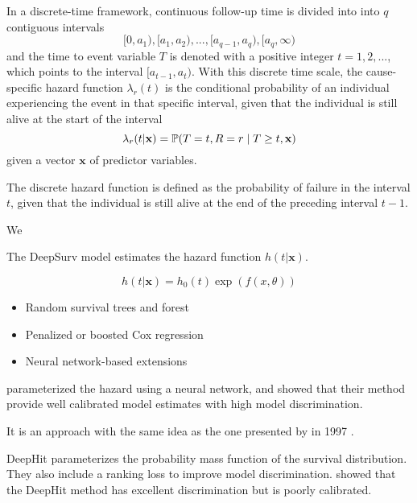 In a discrete-time framework, 
continuous follow-up time is divided into into \(q\) contiguous intervals
%
\begin{equation*}
	[0, a_1), [a_1, a_2), ..., [a_{q-1}, a_q), [a_{q}, \infty)
\end{equation*}
%
and the time to event variable \(T\) is denoted 
with a positive integer \(t = 1, 2, ...\),
which points to the interval \([a_{t-1}, a_{t})\).
With this discrete time scale,
the cause-specific hazard function \(\lambda_{r}(t)\) is 
the conditional probability of an individual experiencing 
the event in that specific interval,
given that the individual is still alive at the start of the interval
%
\begin{equation}
    \lambda_{r}(t | \mathbf{x}) = \operatorname{\mathbb{P}} (T = t, R = r \mid T \geq t, \mathbf{x})
\end{equation}
%
given a vector \(\mathbf{x}\) of predictor variables. 

The discrete hazard function is defined as
the probability of failure in the interval \(t\),
given that the individual is still alive at the end of the preceding interval
\(t - 1\).



\vspace{10em}

We 

The DeepSurv model estimates the hazard function \(h(t|\mathbf{x})\).

\begin{equation}
    h(t | \mathbf{x}) = h_0(t) \exp(f(x, \theta))
\end{equation}

\begin{itemize}
    \item Random survival trees and forest
    \item Penalized or boosted Cox regression
    \item Neural network-based extensions
\end{itemize}




\citeauthor{gensheimerScalable2019} 
parameterized the hazard using a neural network,
and showed that their method provide well calibrated
model estimates with high model discrimination.

It is an approach with the same idea as the one presented by 
\citeauthor{brownUse1997} in 1997 \autocite{brownUse1997}.


DeepHit parameterizes the probability mass function 
of the survival distribution.
They also include a ranking loss to improve model discrimination.
\citeauthor{kvammeContinuous2021} showed that the DeepHit method
has excellent discrimination but is poorly calibrated.



